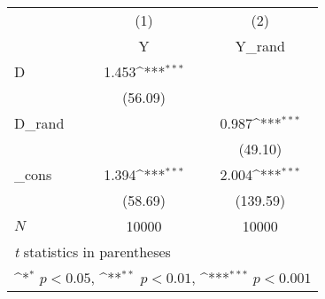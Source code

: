{
\def\sym#1{\ifmmode^{#1}\else\(^{#1}\)\fi}
\begin{tabular}{l*{2}{c}}
\hline\hline
            &\multicolumn{1}{c}{(1)}&\multicolumn{1}{c}{(2)}\\
            &\multicolumn{1}{c}{Y}&\multicolumn{1}{c}{Y\_rand}\\
\hline
D           &       1.453\sym{***}&                     \\
            &     (56.09)         &                     \\
[1em]
D\_rand      &                     &       0.987\sym{***}\\
            &                     &     (49.10)         \\
[1em]
\_cons      &       1.394\sym{***}&       2.004\sym{***}\\
            &     (58.69)         &    (139.59)         \\
\hline
\(N\)       &       10000         &       10000         \\
\hline\hline
\multicolumn{3}{l}{\footnotesize \textit{t} statistics in parentheses}\\
\multicolumn{3}{l}{\footnotesize \sym{*} \(p<0.05\), \sym{**} \(p<0.01\), \sym{***} \(p<0.001\)}\\
\end{tabular}
}

